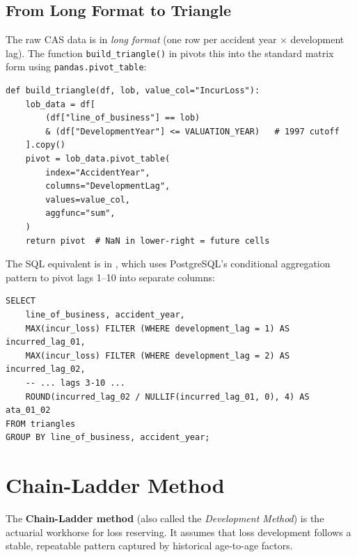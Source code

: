 \subsection{From Long Format to Triangle}

The raw CAS data is in \emph{long format} (one row per accident
year $\times$ development lag). The function \texttt{build\_triangle()} in
 pivots this into the standard matrix form
using \texttt{pandas.pivot\_table}:

\begin{lstlisting}[style=python, caption={Triangle construction in \texttt{04\_compute\_reserves.py}}]
def build_triangle(df, lob, value_col="IncurLoss"):
    lob_data = df[
        (df["line_of_business"] == lob)
        & (df["DevelopmentYear"] <= VALUATION_YEAR)   # 1997 cutoff
    ].copy()
    pivot = lob_data.pivot_table(
        index="AccidentYear",
        columns="DevelopmentLag",
        values=value_col,
        aggfunc="sum",
    )
    return pivot  # NaN in lower-right = future cells
\end{lstlisting}

The SQL equivalent is in , which uses
PostgreSQL's conditional aggregation pattern to pivot lags 1--10 into
separate columns:

\begin{lstlisting}[style=sql, caption={Triangle pivot in SQL (\texttt{04\_triangle\_pivot.sql})}]
SELECT
    line_of_business, accident_year,
    MAX(incur_loss) FILTER (WHERE development_lag = 1) AS incurred_lag_01,
    MAX(incur_loss) FILTER (WHERE development_lag = 2) AS incurred_lag_02,
    -- ... lags 3-10 ...
    ROUND(incurred_lag_02 / NULLIF(incurred_lag_01, 0), 4) AS ata_01_02
FROM triangles
GROUP BY line_of_business, accident_year;
\end{lstlisting}

\section{Chain-Ladder Method}
\label{sec:ins-chain-ladder}


The \textbf{Chain-Ladder method} (also called the \emph{Development Method})
is the actuarial workhorse for loss reserving.  It assumes that loss
development follows a stable, repeatable pattern captured by historical
age-to-age factors.

